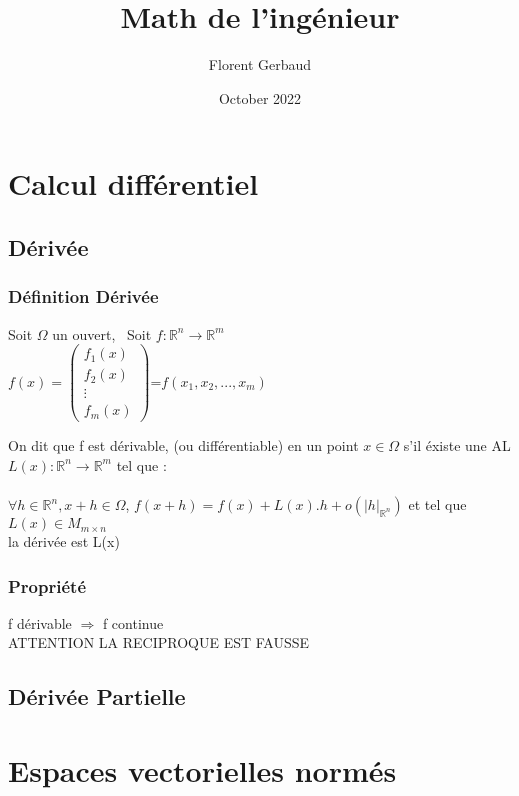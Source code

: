 \documentclass[11pt]{article}
\title{Math de l'ingénieur}
\author{Florent Gerbaud}
\date{October 2022}
\begin{document}
    \maketitle
    \tableofcontents
    \section{Calcul différentiel}
        \subsection{Dérivée}
            \subsubsection{Définition Dérivée}
                \begin{center}
                    Soit $\Omega$ un ouvert, \ 
                    Soit $f: \mathbb{R}^n \longrightarrow \mathbb{R}^m $ \\
                    $f(x)=\begin{pmatrix}
                     f_1(x)\\
                     f_2(x)\\
                    \vdots\\
                     f_m(x)
                    \end{pmatrix}$=$f(x_1,x_2,...,x_m)$
                \end{center}
               
                On dit que f est dérivable, (ou différentiable) en un point $x\in \Omega$ s'il éxiste une AL $L(x):\mathbb{R}^n \longrightarrow \mathbb{R}^m$ tel que : \\ \\
                $\forall h \in \mathbb{R}^n, x+h \in \Omega$, 
                $f(x+h)=f(x)+L(x).h+o(|h|_{\mathbb{R}^n})$ et tel que $L(x) \in M_{m \times n}$
                \\ la dérivée est L(x)
            \subsubsection{Propriété} 
            \begin{center}
                
            \end{center}
                f dérivable $\Longrightarrow$ f continue \\
                \color{red} ATTENTION LA RECIPROQUE EST FAUSSE
                \color{black}
        \subsection{Dérivée Partielle}
    \section{Espaces vectorielles normés}
        
 
\end{document}
